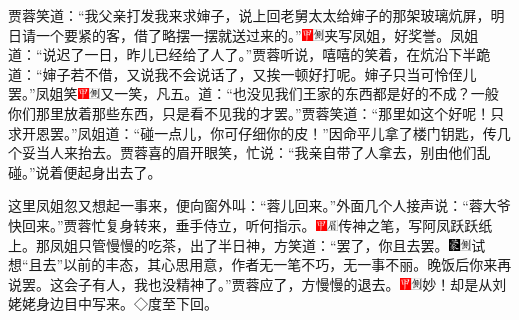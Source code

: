 贾蓉笑道：``我父亲打发我来求婶子，说上回老舅太太给婶子的那架玻璃炕屏，明日请一个要紧的客，借了略摆一摆就送过来的。''{\includegraphics[width=3mm]{../Images/00002}\includegraphics[width=3mm]{../Images/00011}\footnotesize \kaishu 夹写凤姐，好奖誉。}凤姐道：``说迟了一日，昨儿已经给了人了。''贾蓉听说，嘻嘻的笑着，在炕沿下半跪道：``婶子若不借，又说我不会说话了，又挨一顿好打呢。婶子只当可怜侄儿罢。''凤姐笑{\includegraphics[width=3mm]{../Images/00002}\includegraphics[width=3mm]{../Images/00011}\footnotesize \kaishu 又一笑，凡五。}道：``也没见我们王家的东西都是好的不成？一般你们那里放着那些东西，只是看不见我的才罢。''贾蓉笑道：``那里如这个好呢！只求开恩罢。''凤姐道：``碰一点儿，你可仔细你的皮！''因命平儿拿了楼门钥匙，传几个妥当人来抬去。贾蓉喜的眉开眼笑，忙说：``我亲自带了人拿去，别由他们乱碰。''说着便起身出去了。

这里凤姐忽又想起一事来，便向窗外叫：``蓉儿回来。''外面几个人接声说：``蓉大爷快回来。''贾蓉忙复身转来，垂手侍立，听何指示。{\includegraphics[width=3mm]{../Images/00002}\includegraphics[width=3mm]{../Images/00010}\footnotesize \kaishu 传神之笔，写阿凤跃跃纸上。}那凤姐只管慢慢的吃茶，出了半日神，方笑道：``罢了，你且去罢。{\includegraphics[width=3mm]{../Images/00006}\includegraphics[width=3mm]{../Images/00011}\footnotesize \kaishu 试想``且去''以前的丰态，其心思用意，作者无一笔不巧，无一事不丽。}晚饭后你来再说罢。这会子有人，我也没精神了。''贾蓉应了，方慢慢的退去。{\includegraphics[width=3mm]{../Images/00002}\includegraphics[width=3mm]{../Images/00011}\footnotesize \kaishu 妙！却是从刘姥姥身边目中写来。◇度至下回。}

